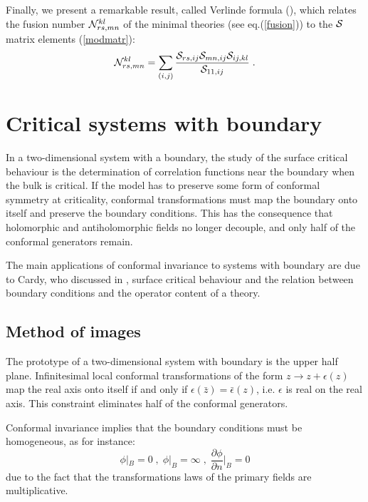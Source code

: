 \documentclass[a4paper,12pt]{report}
\begin{document}
Finally, we present a remarkable result, called Verlinde formula (\cite{verl}), which relates the fusion number
${\cal N}_{rs,mn}^{kl}$ of the minimal theories (see eq.(\ref{fusion})) to the ${\cal S}$ matrix elements
(\ref{modmatr}):
\begin{equation}\label{verlform}
{\cal N}_{rs,mn}^{kl}=\sum_{(i,j)}\frac{{\cal S}_{rs,ij}{\cal S}_{mn,ij}{\cal S}_{ij,kl}}{{\cal S}_{11,ij}}\;.
\end{equation}





\chapter{Critical systems with boundary}

In a two-dimensional system with a boundary, the study of the surface critical behaviour is the determination of
correlation functions near the boundary when the bulk is critical. If the model has to preserve some form of
conformal symmetry at criticality, conformal transformations must map the boundary onto itself and preserve the
boundary conditions. This has the consequence that holomorphic and antiholomorphic fields no longer decouple, and
only half of the conformal generators remain.

The main applications of conformal invariance to systems with boundary are due to Cardy, who discussed in
\cite{cardy0},\cite{cardy1} surface critical behaviour and the relation between boundary conditions and the
operator content of a theory.

\vspace{1cm}

\section{Method of images}

The prototype of a two-dimensional system with boundary is the upper half plane. Infinitesimal local conformal
transformations of the form $z\rightarrow z+\epsilon (z)$ map the real axis onto itself if and only if $\epsilon
(\bar{z})=\bar{\epsilon} (z)$, i.e. $\epsilon$ is real on the real axis. This constraint eliminates half of the
conformal generators.

Conformal invariance implies that the boundary conditions must be homogeneous, as for instance:
\begin{equation}
\phi|_{B}=0 \; , \;\phi|_{B}=\infty \; , \;\frac{\partial\phi}{\partial n}|_{B}=0
\end{equation}
due to the fact that the transformations laws of the primary fields are multiplicative.
\end{document}
